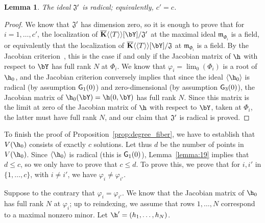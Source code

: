 \documentclass[12pt]{article}
\newtheorem{lemma}[definition]{Lemma}
\begin{document}
\begin{lemma}\label{lemma:Jprimerad}
  The ideal $\frak{J}'$ is radical; equivalently, $c'=c$.
\end{lemma}
\begin{proof}
 We know that $\frak{J}'$ has dimension zero, so it is enough to prove
 that for $i=1,\dots,c'$, the localization of $\KKbar\langle\langle T
 \rangle\rangle[\bY]/\frak{J}'$ at the maximal ideal
 $\mathfrak{m}_{\Phi_i}$ is a field, or equivalently that the
 localization of $\KKbar\langle\langle T \rangle\rangle[\bY]/\frak{J}$
 at $\mathfrak{m}_{\Phi_i}$ is a field.  By the Jacobian
 criterion~\cite[Theorem~16.19.b]{Eisenbud95}, this is the case if and
 only if the Jacobian matrix of $\h$ with respect to $\bY$ has full
 rank $N$ at $\Phi_i$. We know that $\varphi_i=\lim_0(\Phi_i)$ is a
 root of $\h_0$, and the Jacobian criterion conversely implies that
 since the ideal $\langle \h_0 \rangle$ is radical (by assumption
 ${\sf G}_1(0)$) and zero-dimensional (by assumption ${\sf G}_3(0)$),
 the Jacobian matrix of $\h_0(\bY)=\h(0,\bY)$ has full rank $N$. Since
 this matrix is the limit at zero of the Jacobian matrix of $\h$ with
 respect to $\bY$, taken at $\Phi_i$, the latter must have full rank
 $N$, and our claim that $\frak{J}'$ is radical is proved.
\end{proof}

To finish the proof of Proposition~\ref{prop:degree_fiber}, we have to
establish that $V(\h_0)$ consists of exactly $c$ solutions.  Let thus
$d$ be the number of points in $V(\h_0)$.  Since $\langle \h_0
\rangle$ is radical (this is ${\sf G}_1(0)$), Lemma~\ref{lemma:19}
implies that $d \le c$, so we only have to prove that $c \le d$. To
prove this, we prove that for $i,i'$ in $\{1,\dots,c\}$, with $i \ne
i'$, we have $\varphi_i \ne \varphi_{i'}$.

Suppose to the contrary that $\varphi_i = \varphi_{i'}$. We know that
the Jacobian matrix of $\h_0$ has full rank $N$ at $\varphi_i$; up to
reindexing, we assume that rows $1,\dots,N$ correspond to a maximal
nonzero minor. Let $\h'=(h_1,\dots,h_N)$.
\end{document}
